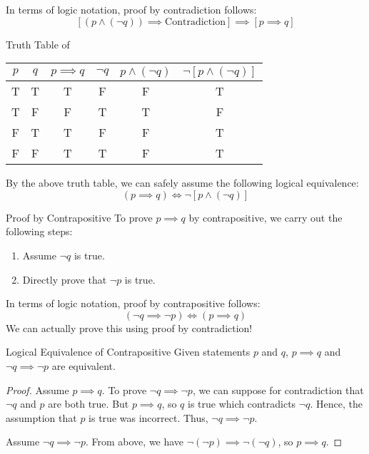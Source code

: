 In terms of logic notation, proof by contradiction follows:
\[ \left[ \left( p \land (\neg q) \right) \implies \text{Contradiction} \right] \implies \left[ p \implies q \right]\]

\begin{exbox}{Truth Table of }{}
    \begin{center}\begin{tabular}{c | c || c | c | c | c }
        $p$ & $q$ & $p \implies q$ & $\neg q$ & $p \land (\neg q)$ & $\neg \left[ p \land (\neg q) \right]$ \\ \hline
        T & T & T & F & F & T \\
        T & F & F & T & T & F \\
        F & T & T & F & F & T \\
        F & F & T & T & F & T
    \end{tabular}\end{center}
\end{exbox}

By the above truth table, we can safely assume the following logical equivalence:
\[ (p \implies q) \iff \neg \left[ p \land (\neg q) \right] \]

\begin{tecbox}{Proof by Contrapositive}{}
    To prove $p \implies q$ by contrapositive, we carry out the following steps:
    \begin{enumerate}
        \item Assume $\neg q$ is true.
        \item Directly prove that $\neg p$ is true.
    \end{enumerate}
\end{tecbox}

In terms of logic notation, proof by contrapositive follows:
\[ (\neg q \implies \neg p) \iff (p \implies q) \]
We can actually prove this using proof by contradiction!
\begin{exbox}{Logical Equivalence of Contrapositive}{}
    Given statements $p$ and $q$, $p \implies q$ and $\neg q \implies \neg p$ are equivalent.
    \tcblower
    \begin{proof}
        Assume $p \implies q$. To prove $\neg q \implies \neg p$, we can suppose for contradiction that $\neg q$ and $p$ are both true. But $p \implies q$, so $q$ is true which contradicts $\neg q$. Hence, the assumption that $p$ is true was incorrect. Thus, $\neg q \implies \neg p$.

        Assume $\neg q \implies \neg p$. From above, we have $\neg ( \neg p ) \implies \neg (\neg q)$, so $p \implies q$.
    \end{proof}
\end{exbox}

